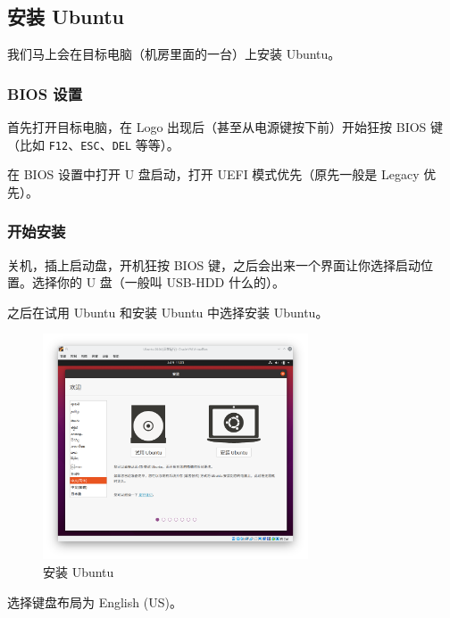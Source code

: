 \documentclass[UTF-8]{ctexart}
\begin{document}
		\subsection{安装 Ubuntu}
		
			我们马上会在目标电脑（机房里面的一台）上安装 Ubuntu。
		
			\subsubsection{BIOS 设置}
			
				首先打开目标电脑，在 Logo 出现后（甚至从电源键按下前）开始狂按 BIOS 键（比如 \texttt{F12}、\texttt{ESC}、\texttt{DEL} 等等）。
				
				在 BIOS 设置中打开 U 盘启动，打开 UEFI 模式优先（原先一般是 Legacy 优先）。
			
			\subsubsection{开始安装}
				
				关机，插上启动盘，开机狂按 BIOS 键，之后会出来一个界面让你选择启动位置。选择你的 U 盘（一般叫 USB-HDD 什么的）。
				
				之后在试用 Ubuntu 和安装 Ubuntu 中选择安装 Ubuntu。
				
				\begin{figure}[H]
					\centering
					\includegraphics[width=0.7\textwidth]{fig/ubuntu_install_1.png}
					\caption*{安装 Ubuntu}
				\end{figure}
			
				选择键盘布局为 English (US)。
			
\end{document}
